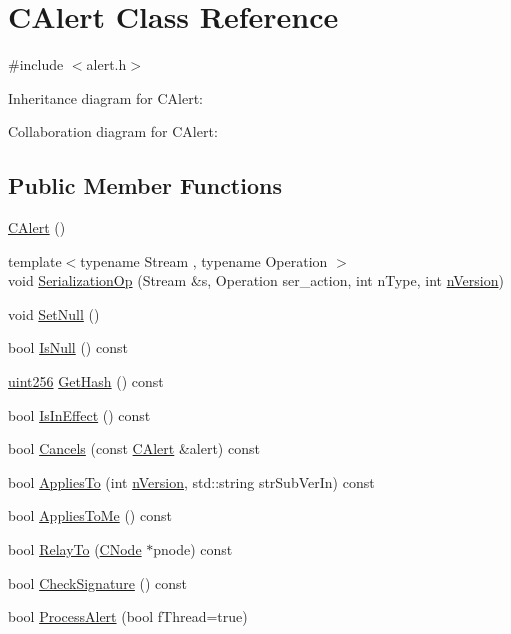\hypertarget{class_c_alert}{}\section{C\+Alert Class Reference}
\label{class_c_alert}


{\ttfamily \#include $<$alert.\+h$>$}



Inheritance diagram for C\+Alert\+:


Collaboration diagram for C\+Alert\+:
\subsection*{Public Member Functions}
\begin{DoxyCompactItemize}
\item 
\hyperlink{class_c_alert_a116117e2318b9468a5ca80472c0b5157}{C\+Alert} ()
\item 
{\footnotesize template$<$typename Stream , typename Operation $>$ }\\void \hyperlink{class_c_alert_a51d73ab316bb42e65b87ec14ac536b14}{Serialization\+Op} (Stream \&s, Operation ser\+\_\+action, int n\+Type, int \hyperlink{class_c_unsigned_alert_ad8fad8e8f62caaf8162fad19170de2cf}{n\+Version})
\item 
void \hyperlink{class_c_alert_a93fd881c55ab448213787f49e316eb99}{Set\+Null} ()
\item 
bool \hyperlink{class_c_alert_ae7e110993e592a1a4f99379ab4fcfa08}{Is\+Null} () const 
\item 
\hyperlink{classuint256}{uint256} \hyperlink{class_c_alert_a59a57a4b4e93bd186ef18d4f09ebd844}{Get\+Hash} () const 
\item 
bool \hyperlink{class_c_alert_a00a8ae5ba7bc54ac7943558c33021190}{Is\+In\+Effect} () const 
\item 
bool \hyperlink{class_c_alert_a90d31fb31348f81b767f16dc5465871b}{Cancels} (const \hyperlink{class_c_alert}{C\+Alert} \&alert) const 
\item 
bool \hyperlink{class_c_alert_add9f485e29a3d1ffea20e6a5a4e42f26}{Applies\+To} (int \hyperlink{class_c_unsigned_alert_ad8fad8e8f62caaf8162fad19170de2cf}{n\+Version}, std\+::string str\+Sub\+Ver\+In) const 
\item 
bool \hyperlink{class_c_alert_a0a7fab6a971781904afb3e4a0ee29e12}{Applies\+To\+Me} () const 
\item 
bool \hyperlink{class_c_alert_ae89d673f6f1285eefcc343b3c029dab5}{Relay\+To} (\hyperlink{class_c_node}{C\+Node} $\ast$pnode) const 
\item 
bool \hyperlink{class_c_alert_a40b71fc58ec056e3e539663152092030}{Check\+Signature} () const 
\item 
bool \hyperlink{class_c_alert_af3e6b2e5d3584f58c5d7be9dbd72b4cc}{Process\+Alert} (bool f\+Thread=true)
\end{DoxyCompactItemize}
